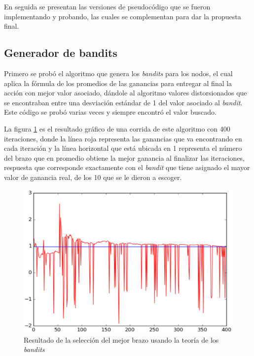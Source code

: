 
En seguida se presentan las versiones de pseudocódigo que se fueron implementando y probando, las cuales se complementan para dar la propuesta final.

\subsection{Generador de bandits}

Primero se probó el algoritmo que genera los \textit{bandits} para los nodos, el cual aplica la fórmula de los promedios de las ganancias para entregar al final la acción con mejor valor asociado, dándole al algoritmo valores distorsionados que se encontraban entre una desviación estándar de 1 del valor asociado al \textit{bandit}. Este código se probó varias veces y siempre encontró el valor buscado. 

La figura \ref{AlgBandit} es el resultado gráfico de una corrida de este algoritmo con 400 iteraciones, donde la línea roja representa las ganancias que va encontrando en cada iteración y la línea horizontal que está ubicada en 1 representa el número del brazo que en promedio obtiene la mejor ganancia al finalizar las iteraciones, respuesta que corresponde exactamente con el \textit{bandit} que tiene asignado el mayor valor de ganancia real, de los 10 que se le dieron a escoger.

\begin{figure} [H]
    \label{Resul2}
	\centering
	\includegraphics[scale=0.6]{AlgBandit}
	\caption[Resultado de la selección de brazo usando \textit{bandits}]{Resultado de la selección del mejor brazo usando la teoría de los \textit{bandits}}
	\label{AlgBandit}
\end{figure}

